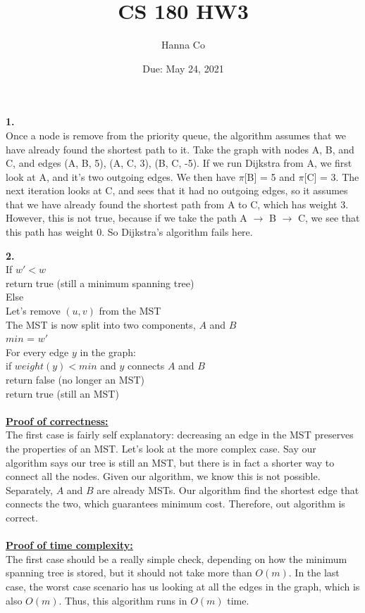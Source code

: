 \documentclass[10pt, letterpaper]{report}
\title{CS 180 HW3}
\author{Hanna Co}
\date{Due: May 24, 2021}
\newcommand\tab[1][1cm]{\hspace*{#1}}
\begin{document}
\maketitle
\noindent \large{\textbf{1.} } \\
Once a node is remove from the priority queue, the algorithm assumes that we have already found the shortest path to it. Take the graph with nodes A, B, and C, and edges (A, B, 5), (A, C, 3), (B, C, -5). If we run Dijkstra from A, we first look at A, and it's two outgoing edges. We then have $\pi$[B] = 5 and $\pi$[C] = 3. The next iteration looks at C, and sees that it had no outgoing edges, so it assumes that we have already found the shortest path from A to C, which has weight 3. However, this is not true, because if we take the path A $\rightarrow$ B $\rightarrow$ C, we see that this path has weight 0. So Dijkstra's algorithm fails here.

\newpage
\noindent \large{\textbf{2.} } \\
If \(w' < w\)\\
\tab return true (still a minimum spanning tree)\\
Else \\
\tab Let's remove $(u,v)$ from the MST\\
\tab The MST is now split into two components, $A$ and $B$\\
\tab $min$ = $w'$\\
\tab For every edge $y$ in the graph:\\
\tab\tab if $weight(y) < min$ and $y$ connects $A$ and $B$\\
\tab\tab\tab return false (no longer an MST)\\
\tab return true (still an MST)\\
\\
\textbf{\underline{Proof of correctness:}}\\
The first case is fairly self explanatory: decreasing an edge in the MST preserves the properties of an MST. Let's look at the more complex case. Say our algorithm says our tree is still an MST, but there is in fact a shorter way to connect all the nodes. Given our algorithm, we know this is not possible. Separately, $A$ and $B$ are already MSTs. Our algorithm find the shortest edge that connects the two, which guarantees minimum cost. Therefore, out algorithm is correct.\\
\\
\textbf{\underline{Proof of time complexity:}}\\
The first case should be a really simple check, depending on how the minimum spanning tree is stored, but it should not take more than $O(m)$. In the last case, the worst case scenario has us looking at all the edges in the graph, which is also $O(m)$. Thus, this algorithm runs in $O(m)$ time.
\end{document}
